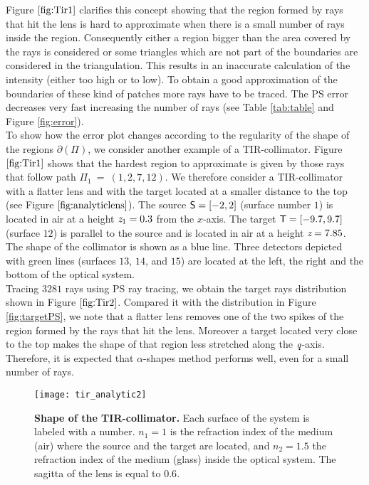 Figure $\ref{fig:Tir1}$ clarifies this concept showing that the region formed by rays that hit the lens is hard to approximate when there is a small number of rays inside the region. Consequently either a region bigger than the area covered by the rays is considered or some triangles which are not part of the boundaries are considered in the triangulation. This results in an inaccurate calculation of the intensity (either too high or to low). To obtain a good approximation of the boundaries of these kind of patches more rays have to be traced. The PS error decreases very fast increasing the number of rays (see Table
 \ref{tab:table} and Figure \ref{fig:error}).
 \\\indent To show how the error plot changes according to the regularity of the shape of the regions $\partial$$(\Pi)$, we consider another example of a TIR-collimator.
 Figure $\ref{fig:Tir1}$ shows that the hardest region to approximate is given by those rays that follow path $\Pi_1 ~=~ (1,2,7,12)$.
 We therefore consider a TIR-collimator with a flatter lens and with the target located at a smaller distance to the top (see Figure $\ref{fig:analyticlens}$). 
The source $\textsf{S}= [-2,2]$ (surface number $1$) is located in air at a height $\textit{z}_1 = 0.3$ from the $x$-axis.
       The target $\textsf{T}= [-9.7, 9.7]$ (surface $12$) is parallel to the source and is located in air at a height $ \textit{z}= 7.85$.
       The shape of the collimator is shown as a blue line.
       Three detectors depicted with green lines (surfaces $13$, $14$, and $15$) are located at the left, the right and the bottom of the optical system.
 \\ \indent Tracing $3281$ rays using PS ray tracing, we obtain the target rays distribution shown in Figure $\ref{fig:Tir2}$. 
Compared it with the distribution in Figure \ref{fig:targetPS}, we note that a flatter lens removes one of the two spikes of the region formed by the rays that hit the lens.
Moreover a target located very close to the top makes the shape of that region less stretched along the $\textit{q}$-axis.
Therefore, it is expected that $\alpha$-shapes method performs well, even for a small number of rays.
\begin{figure}[h]
  \begin{center}
  \texttt{[image: tir\_analytic2]}
   \end{center}
    \caption{\textbf{Shape of the TIR-collimator.} Each surface of the system is labeled with a number.
       $n_1 = 1$ is the refraction index of the medium (air) where the source and the target are located, and
       $n_2 = 1.5 $ the refraction index of the medium (glass) inside the optical system. The sagitta of the lens is equal to $0.6$.}
 \label{fig:analyticlens}
\end{figure}
